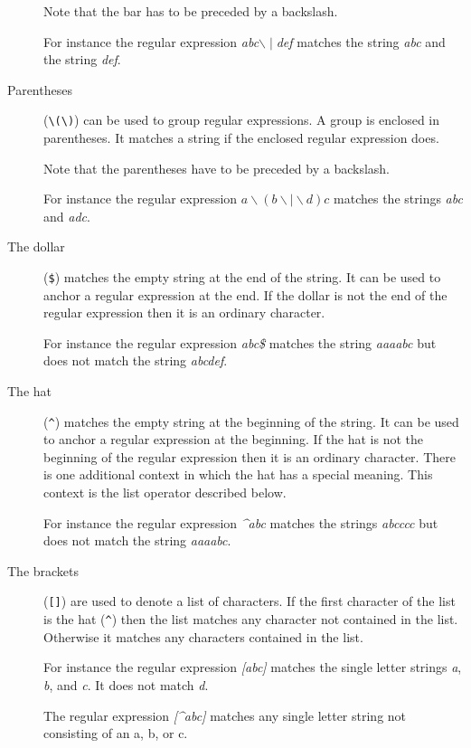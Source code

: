 \documentclass[11pt,a4paper]{scrbook}
\newcommand\Hat{\^{}}
\begin{document}
\begin{description}
  Note that the bar has to be preceded by a backslash.
  
  For instance the regular expression \emph{abc\(\backslash\mid\)def} matches
  the string \emph{abc} and the string \emph{def}.

\item[Parentheses] (\verb|\(\)|) can be used to group regular expressions. A
  group is enclosed in parentheses. It matches a string if the enclosed
  regular expression does.

  Note that the parentheses have to be preceded by a backslash.
  
  For instance the regular expression
  \emph{\(a\backslash(b\backslash\mid\backslash d)c\)} matches the strings
  \emph{abc} and \emph{adc}.
  
\item[The dollar] (\verb|$|) %
  matches the empty string at the end of the string. It can be used to anchor
  a regular expression at the end.  If the dollar is not the end of the
  regular expression then it is an ordinary character.

  For instance the regular expression \emph{abc\$} matches the string
  \emph{aaaabc} but does not match the string \emph{abcdef}.
  
\item[The hat] (\texttt{\Hat}) matches the empty string at the beginning of
  the string. It can be used to anchor a regular expression at the beginning.
  If the hat is not the beginning of the regular expression then it is an
  ordinary character. There is one additional context in which the hat has a
  special meaning. This context is the list operator described below.

  For instance the regular expression \emph{\Hat abc} matches the strings
  \emph{abcccc} but does not match the string \emph{aaaabc}.
  
\item[The brackets] (\verb|[]|) are used to denote a list of characters. If
  the first character of the list is the hat (\texttt{\Hat}) then the list
  matches any character not contained in the list. Otherwise it matches any
  characters contained in the list.

  For instance the regular expression \emph{[abc]} matches the single letter
  strings \emph{a}, \emph{b}, and \emph{c}. It does not match \emph{d}.

  The regular expression \emph{[\Hat abc]} matches any single letter string
  not consisting of an a, b, or c.
  

\end{description}
\end{document}
